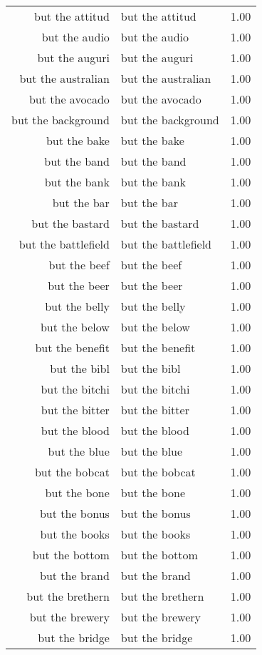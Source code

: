 \begin{table}[ht]
\begin{tabular}{rlr}
  but the attitud & but the attitud & 1.00 \\ 
  but the audio & but the audio & 1.00 \\ 
  but the auguri & but the auguri & 1.00 \\ 
  but the australian & but the australian & 1.00 \\ 
  but the avocado & but the avocado & 1.00 \\ 
  but the background & but the background & 1.00 \\ 
  but the bake & but the bake & 1.00 \\ 
  but the band & but the band & 1.00 \\ 
  but the bank & but the bank & 1.00 \\ 
  but the bar & but the bar & 1.00 \\ 
  but the bastard & but the bastard & 1.00 \\ 
  but the battlefield & but the battlefield & 1.00 \\ 
  but the beef & but the beef & 1.00 \\ 
  but the beer & but the beer & 1.00 \\ 
  but the belly & but the belly & 1.00 \\ 
  but the below & but the below & 1.00 \\ 
  but the benefit & but the benefit & 1.00 \\ 
  but the bibl & but the bibl & 1.00 \\ 
  but the bitchi & but the bitchi & 1.00 \\ 
  but the bitter & but the bitter & 1.00 \\ 
  but the blood & but the blood & 1.00 \\ 
  but the blue & but the blue & 1.00 \\ 
  but the bobcat & but the bobcat & 1.00 \\ 
  but the bone & but the bone & 1.00 \\ 
  but the bonus & but the bonus & 1.00 \\ 
  but the books & but the books & 1.00 \\ 
  but the bottom & but the bottom & 1.00 \\ 
  but the brand & but the brand & 1.00 \\ 
  but the brethern & but the brethern & 1.00 \\ 
  but the brewery & but the brewery & 1.00 \\ 
  but the bridge & but the bridge & 1.00 \\ 

\end{tabular}
\end{table}
